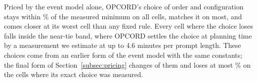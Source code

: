 Priced by the event model alone, OPCORD's choice of order and configuration stays within \ChoiceOpcordMax\% of the measured minimum on all \ChoiceCells{} cells, matches it on most, and comes closer at its worst cell than any fixed rule.
Every cell where the choice loses falls inside the near-tie band, where OPCORD settles the choice at planning time by a measurement we estimate at up to 4.6 minutes per prompt length.
These choices come from an earlier form of the event model with the same constants; the final form of Section~\ref{subsec:pricing} changes \FinalChanged{} of them and loses at most \FinalLossMax\% on the \FinalMeasured{} cells where its exact choice was measured.

